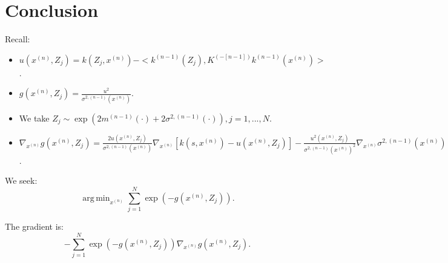 \documentclass[paper=a4, fontsize=11pt]{scrartcl} %
\DeclareMathOperator*{\argmin}{arg\,min}
\numberwithin{equation}{section} %
\numberwithin{figure}{section} %
\numberwithin{table}{section} %
\newcommand{\gxn}{\nabla_{x^{(n)}}} %
\newcommand{\xn}{x^{(n)}} %
\newcommand{\mnm}{m^{(n-1)}}
\newcommand{\knm}{k^{(n-1)}}
\newcommand{\Kinvnm}{K^{(-[n-1])}}
\newcommand{\sqnm}{\sigma ^{2 , (n-1)}     }
\begin{document}
\section{Conclusion}
Recall:
\begin{itemize}
 \item $u(\xn,Z_j) = k(Z_j, \xn)  - < \knm (Z_j) ,  \Kinvnm \knm (\xn) >$.
 \item $g(\xn, Z_j) = \frac{u^2}{\sqnm( \xn )} $.
 \item We take $Z_j \sim \exp( 2\mnm (\cdot) +2\sqnm(\cdot) ), j=1,...,N$.
\item $\gxn g(\xn,Z_j) =\frac{ 2u(\xn, Z_j)}{\sqnm(\xn)} \gxn [k(s , \xn) - u(\xn, Z_j)] - \frac{u^2(\xn,Z_j)}{\sqnm(\xn)^2}\gxn \sqnm(\xn)$.
 \end{itemize}


We seek:
$$
\argmin_{\xn} \sum_{j=1}^{N} \exp(-g(\xn, Z_j)).
$$

The gradient is:
$$
-\sum_{j=1}^{N} \exp(-g(\xn,Z_j)) \gxn g(\xn, Z_j).
$$
\end{document}
